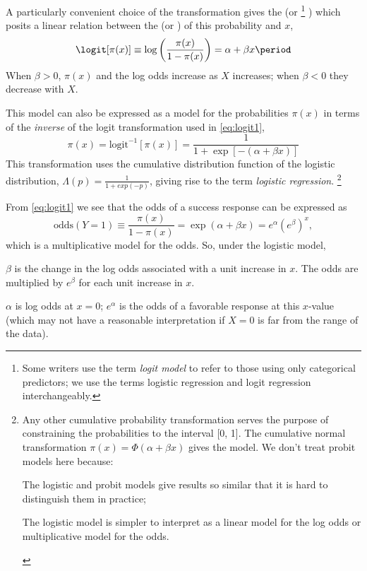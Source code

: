 \documentclass[11pt]{book}
\begin{document}
A particularly convenient choice of the transformation
gives the 
(or %
\footnote{
Some writers use the term \emph{logit model} to refer to those using only
categorical predictors; we use the terms logistic regression and
logit regression interchangeably.
}
)
which posits a linear relation between
the  (or ) of this probability and $x$,
\begin{equation}\label{eq:logit1}
\logit[ \pi(x) ] \equiv
\log \left( \frac{\pi(x) }{1-\pi(x) } \right) =
\alpha + \beta x \period
\end{equation}
When $\beta > 0$, $\pi (x)$ and the log odds increase as $X$ increases;
when $\beta < 0$ they decrease with $X$.

This model can also be expressed as a model for the probabilities $\pi (x)$
in terms of the \emph{inverse} of the logit transformation used in \eqref{eq:logit1},
\begin{equation}\label{eq:logit1a}
\pi (x) =
\mbox{logit}^{-1}[ \pi(x) ] =
\frac{1}{1 + \exp [- (\alpha + \beta x) ]}
\end{equation}
This transformation uses the cumulative distribution function of
the logistic distribution, $\Lambda (p) = \frac{1}{1+exp(-p)}$,
giving rise to the term \emph{logistic regression}.%
\footnote{
Any other cumulative probability transformation serves the purpose of 
constraining the probabilities to the interval [0, 1].
The cumulative normal transformation $\pi (x) = \Phi (\alpha + \beta x)$
gives the  model.
We don't treat probit models here because:
\begin{seriate}
 \item The logistic and probit models give results so similar that it is
 hard to distinguish them in practice;
 \item The logistic model is simpler to interpret as a linear model for
 the log odds or multiplicative model for the odds.
\end{seriate}
}

From \eqref{eq:logit1} we see that the odds of a success response
can be expressed as
%
\begin{equation}\label{eq:logit2}
\mbox{odds}(Y=1) \equiv \frac{\pi(x) }{1-\pi(x) }  =
\exp (\alpha + \beta x) = e^{\alpha} ( e^{\beta} )^x \comma
\end{equation}
%
which is a multiplicative model for the odds.
So, under the logistic model,
\begin{itemize*}
\item $\beta$ is the change in the log odds associated with a unit
increase in $x$.
The odds are multiplied by $e^{\beta}$ for each unit increase in $x$.
\item $\alpha$ is log odds at $x=0$; $e^{\alpha}$ is the odds of
a favorable response at this $x$-value
(which may not have a reasonable interpretation if $X=0$ is far from
the range of the data).
\end{itemize*}
\end{document}
